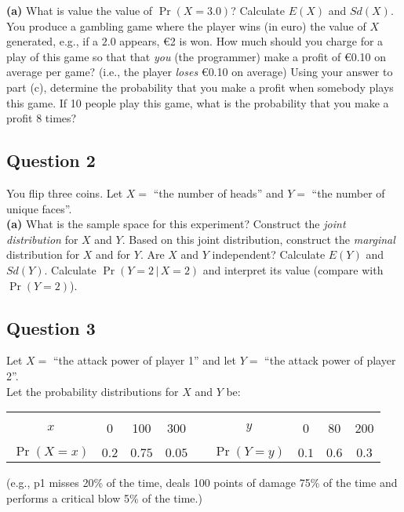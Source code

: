{\bf(a)} What is value the value of $\Pr(X = 3.0)$?  Calculate $E(X)$ and $Sd(X)$.  You produce a gambling game where the player wins (in euro) the value of $X$ generated, e.g., if a $2.0$ appears, \euro{2} is won. How much should you charge for a play of this game so that that \emph{you} (the programmer) make a profit of \euro{0.10} on average per game? (i.e., the player \emph{loses} \euro{0.10} on average)  Using your answer to part (c), determine the probability that you make a profit when somebody plays this game.  If 10 people play this game, what is the probability that you make a profit 8 times?

\subsection*{Question 2}
You flip three coins. Let $X = $ ``the number of heads'' and $Y = $ ``the number of unique faces''.\\[-0.2cm]

{\bf(a)} What is the sample space for this experiment?  Construct the \emph{joint distribution} for $X$ and $Y$.  Based on this joint distribution, construct the \emph{marginal} distribution for $X$ and for $Y$.  Are $X$ and $Y$ independent?  Calculate $E(Y)$ and $Sd(Y)$.  Calculate $\Pr(Y=2\,|\,X=2)$ and interpret its value (compare with $\Pr(Y=2)$).


\subsection*{Question 3}
Let $X =$ ``the attack power of player 1'' and let $Y =$ ``the attack power of player 2''.\\[-0.3cm]

Let the probability distributions for $X$ and $Y$ be:
\begin{center}
	\begin{tabular}{|c|ccc|c|c|ccc|}
		\cline{1-4}\cline{6-9}
		&&&&&&&&\\[-0.4cm]
		$x$ & 0 & 100 & 300 & \qquad\qquad & $y$ & 0 & 80 & 200\\
		\cline{1-4}\cline{6-9}
		&&&&&&&&\\[-0.4cm]
		$\Pr(X=x)$ & $0.2$ & $0.75$ & $0.05$ & & $\Pr(Y=y)$ & $0.1$ & $0.6$ & $0.3$ \\[0.1cm]
		\cline{1-4}\cline{6-9}
	\end{tabular}
\end{center}
{\footnotesize(e.g., p1 misses 20\% of the time, deals 100 points of damage 75\% of the time and performs a critical blow 5\% of the time.)}\\[-0.2cm]

